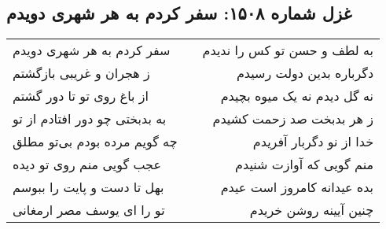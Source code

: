 \begin{center}
\section*{غزل شماره ۱۵۰۸: سفر کردم به هر شهری دویدم}
\label{sec:1508}
\begin{longtable}{l p{0.5cm} r}
سفر کردم به هر شهری دویدم
&&
به لطف و حسن تو کس را ندیدم
\\
ز هجران و غریبی بازگشتم
&&
دگرباره بدین دولت رسیدم
\\
از باغ روی تو تا دور گشتم
&&
نه گل دیدم نه یک میوه بچیدم
\\
به بدبختی چو دور افتادم از تو
&&
ز هر بدبخت صد زحمت کشیدم
\\
چه گویم مرده بودم بی‌تو مطلق
&&
خدا از نو دگربار آفریدم
\\
عجب گویی منم روی تو دیده
&&
منم گویی که آوازت شنیدم
\\
بهل تا دست و پایت را ببوسم
&&
بده عیدانه کامروز است عیدم
\\
تو را ای یوسف مصر ارمغانی
&&
چنین آیینه روشن خریدم
\\
\end{longtable}
\end{center}
